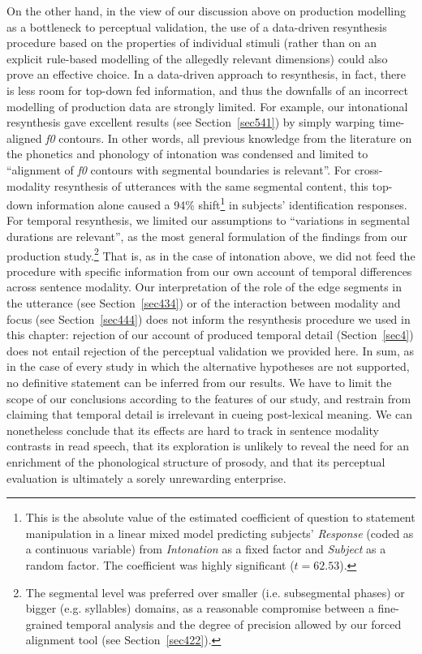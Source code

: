 On the other hand, in the view of our discussion above on production modelling as a bottleneck to perceptual validation, the use of a data-driven resynthesis procedure based on the properties of individual stimuli (rather than on an explicit rule-based modelling of the allegedly relevant dimensions) could also prove an effective choice. In a data-driven approach to resynthesis, in fact, there is less room for top-down fed information, and thus the downfalls of an incorrect modelling of production data are strongly limited. For example, our intonational resynthesis gave excellent results (see Section~\ref{sec541}) by simply warping time-aligned \textit{f0} contours. In other words, all previous knowledge from the literature on the phonetics and phonology of intonation was condensed and limited to ``alignment of \textit{f0} contours with segmental boundaries is relevant''. For cross-modality resynthesis of utterances with the same segmental content, this top-down information alone caused a 94\% shift\footnote{This is the absolute value of the estimated coefficient of question to statement manipulation in a linear mixed model predicting subjects' \textit{Response} (coded as a continuous variable) from \textit{Intonation} as a fixed factor and \textit{Subject} as a random factor. The coefficient was highly significant ($t=62.53$).} in subjects' identification responses. For temporal resynthesis, we limited our assumptions to ``variations in segmental durations are relevant'', as the most general formulation of the findings from our production study.\footnote{The segmental level was preferred over smaller (i.e. subsegmental phases) or bigger (e.g. syllables) domains, as a reasonable compromise between a fine-grained temporal analysis and the degree of precision allowed by our forced alignment tool (see Section~\ref{sec422}).} That is, as in the case of intonation above, we did not feed the procedure with specific information from our own account of temporal differences across sentence modality. Our interpretation of the role of the edge segments in the utterance (see Section~\ref{sec434}) or of the interaction between modality and focus (see Section~\ref{sec444}) does not inform the resynthesis procedure we used in this chapter: rejection of our account of produced temporal detail (Section~\ref{sec4}) does not entail rejection of the perceptual validation we provided here.
In sum, as in the case of every study in which the alternative hypotheses are not supported, no definitive statement can be inferred from our results. We have to limit the scope of our conclusions according to the features of our study, and restrain from claiming that temporal detail is irrelevant in cueing post-lexical meaning. We can nonetheless conclude that its effects are hard to track in sentence modality contrasts in read speech, that its exploration is unlikely to reveal the need for an enrichment of the phonological structure of prosody, and that its perceptual evaluation is ultimately a sorely unrewarding enterprise.
